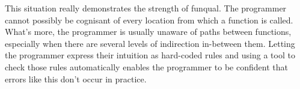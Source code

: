 This situation really demonstrates the strength of funqual.  The programmer cannot possibly be cognisant of every location from which a function is called.  What's more, the programmer is usually unaware of paths between functions, especially when there are several levels of indirection in-between them.  Letting the programmer express their intuition as hard-coded rules and using a tool to check those rules automatically enables the programmer to be confident that errors like this don't occur in practice.  
